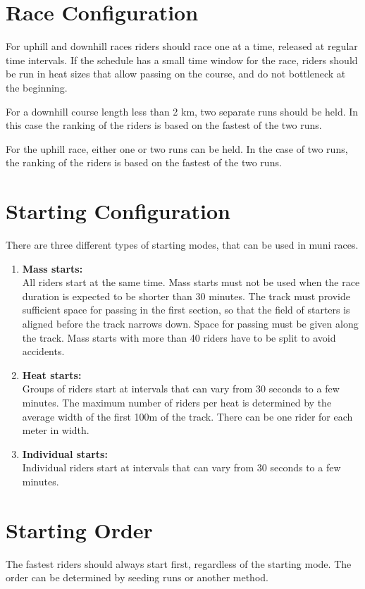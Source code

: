 \section{Race Configuration}

For uphill and downhill races riders should race one at a time, released at regular time intervals.
If the schedule has a small time window for the race, riders should be run in heat sizes that allow passing on the course, and do not bottleneck at the beginning.

For a downhill course length less than 2 km, two separate runs should be held.
In this case the ranking of the riders is based on the fastest of the two runs.

For the uphill race, either one or two runs can be held.
In the case of two runs, the ranking of the riders is based on the fastest of the two runs.

\section{Starting Configuration}

There are three different types of starting modes, that can be used in muni races.
\begin{enumerate}
\item \textbf{Mass starts:}\\
All riders start at the same time.
Mass starts must not be used when the race duration is expected to be shorter than 30 minutes.
The track must provide sufficient space for passing in the first section, so that the field of starters is aligned before the track narrows down.
Space for passing must be given along the track.
Mass starts with more than 40 riders have to be split to avoid accidents.
\item \textbf{Heat starts:}\\
Groups of riders start at intervals that can vary from 30 seconds to a few minutes.
The maximum number of riders per heat is determined by the average width of the first 100m of the track.
There can be one rider for each meter in width.
\item \textbf{Individual starts:}\\
Individual riders start at intervals that can vary from 30 seconds to a few minutes.
\end{enumerate}

\section{Starting Order}

The fastest riders should always start first, regardless of the starting mode.
The order can be determined by seeding runs or another method.
